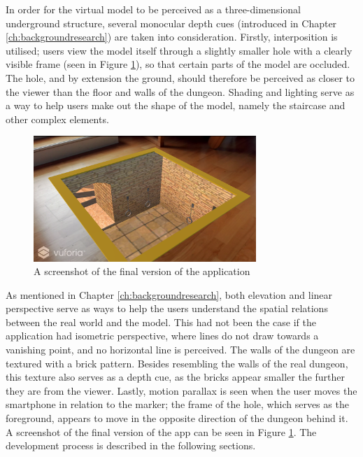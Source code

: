 In order for the virtual model to be perceived as a three-dimensional underground structure, several monocular depth cues (introduced in Chapter \ref{ch:backgroundresearch}) are taken into consideration. Firstly, interposition is utilised; users view the model itself through a slightly smaller hole with a clearly visible frame (seen in Figure \ref{fig:final_screenshot}), so that certain parts of the model are occluded. The hole, and by extension the ground, should therefore be perceived as closer to the viewer than the floor and walls of the dungeon. Shading and lighting serve as a way to help users make out the shape of the model, namely the staircase and other complex elements.

\begin{figure}[h!]
   \centering
   \includegraphics[width=0.75\textwidth]{figures/final_screenshot.png}
   \caption{A screenshot of the final version of the application}\label{fig:final_screenshot}
\end{figure}\pagebreak

As mentioned in Chapter \ref{ch:backgroundresearch}, both elevation and linear perspective serve as ways to help the users understand the spatial relations between the real world and the model. This had not been the case if the application had isometric perspective, where lines do not draw towards a vanishing point, and no horizontal line is perceived. The walls of the dungeon are textured with a brick pattern. Besides resembling the walls of the real dungeon, this texture also serves as a depth cue, as the bricks appear smaller the further they are from the viewer. Lastly, motion parallax is seen when the user moves the smartphone in relation to the marker; the frame of the hole, which serves as the foreground, appears to move in the opposite direction of the dungeon behind it.
A screenshot of the final version of the app can be seen in Figure \ref{fig:final_screenshot}. The development process is described in the following sections.

